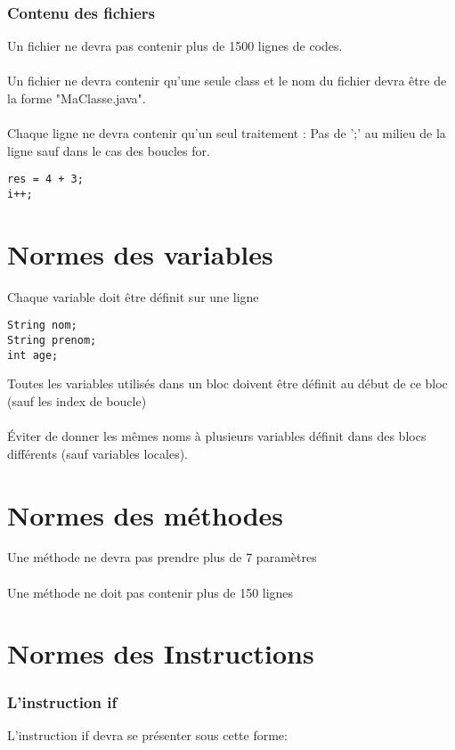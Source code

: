 \documentclass{article}
\begin{document}
\section{Contenu des fichiers}


Un fichier ne devra pas contenir plus de 1500 lignes de codes.
\\
\\
Un fichier ne devra contenir qu'une seule class et le nom du fichier devra être de la forme "MaClasse.java".
\\
\\
Chaque ligne ne devra contenir qu'un seul traitement : Pas de ';' au milieu de la ligne sauf dans le cas des boucles for.

\begin{lstlisting}
res = 4 + 3;
i++;
\end{lstlisting}

\part*{Normes des variables}

Chaque variable doit être définit sur une ligne
\begin{lstlisting}
String nom;
String prenom;
int age;
\end{lstlisting}

Toutes les variables utilisés dans un bloc doivent être définit au début de ce bloc (sauf les index de boucle)
\\
\\
Éviter de donner les mêmes noms à plusieurs variables définit dans des blocs différents (sauf variables locales).


\part*{Normes des méthodes}

Une méthode ne devra pas prendre plus de 7 paramètres
\\
\\
Une méthode ne doit pas contenir plus de 150 lignes

\newpage
{}
\part*{Normes des Instructions}
\setcounter{section}{0}
\section{L'instruction if}
L'instruction if devra se présenter sous cette forme:
\end{document}
